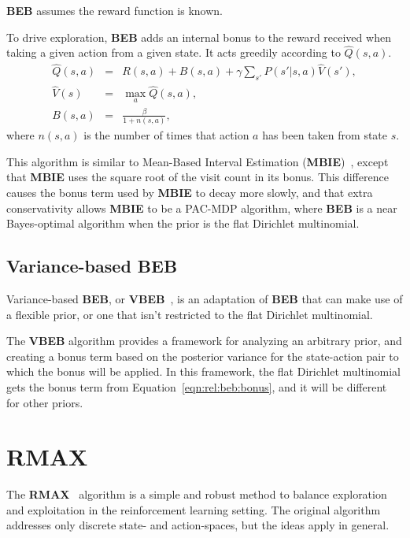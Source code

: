 {\bf BEB} assumes the reward function is known.

To drive exploration, {\bf BEB} adds an internal bonus to the reward received when taking a given action from a given state. It acts greedily according to $\hat Q(s,a)$.
\begin{eqnarray}
\hat Q(s,a)&=&R(s,a)+B(s,a)+\gamma \sum_{s'} P(s'|s,a)\hat V(s'),\\
\hat V(s)&=& \max_a \hat Q(s, a),\\
\label{eqn:rel:beb:bonus}
B(s,a)&=&\frac\beta{1+n(s,a)},
\end{eqnarray}
where $n(s,a)$ is the number of times that action $a$ has been taken from state $s$.

This algorithm is similar to Mean-Based Interval Estimation ({\bf MBIE})~\cite{strehl06}, except that {\bf MBIE} uses the square root of the visit count in its bonus. This difference causes the bonus term used by {\bf MBIE} to decay more slowly, and that extra conservativity allows {\bf MBIE} to be a PAC-MDP algorithm, where {\bf BEB} is a near Bayes-optimal algorithm when the prior is the flat Dirichlet multinomial.

\subsection{Variance-based BEB}

Variance-based {\bf BEB}, or {\bf VBEB}~\cite{sorg10}, is an adaptation of {\bf BEB} that can make use of a flexible prior, or one that isn't restricted to the flat Dirichlet multinomial.

The {\bf VBEB} algorithm provides a framework for analyzing an arbitrary prior, and creating a bonus term based on the posterior variance for the state-action pair to which the bonus will be applied. In this framework, the flat Dirichlet multinomial gets the bonus term from Equation~\ref{eqn:rel:beb:bonus}, and it will be different for other priors.



\section{RMAX}

The {\bf RMAX}~\cite{brafman03} algorithm is a simple and robust method to balance exploration and exploitation in the reinforcement learning setting. The original algorithm addresses only discrete state- and action-spaces, but the ideas apply in general.

